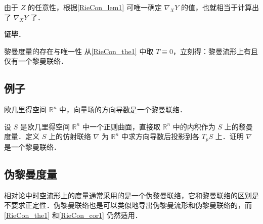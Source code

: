 由于 $Z$ 的任意性，根据\autoref{RieCon_lem1} 可唯一确定 $\nabla_XY$ 的值，也就相当于计算出了 $\nabla_XY$ 了．

\textbf{证毕}．

\begin{corollary}{黎曼度量的存在与唯一性}\label{RieCon_cor1}
从\autoref{RieCon_the1} 中取 $T\equiv 0$，立刻得：黎曼流形上有且仅有一个黎曼联络．
\end{corollary}

\subsection{例子}

\begin{example}{}
欧几里得空间 $\mathbb{R}^n$ 中，向量场的方向导数是一个黎曼联络．
\end{example}


\begin{exercise}{}
设 $S$ 是欧几里得空间 $\mathbb{R}^n$ 中一个正则曲面，直接取 $\mathbb{R}^n$ 中的内积作为 $S$ 上的黎曼度量．定义 $S$ 上的仿射联络 $\nabla$ 为 $\mathbb{R}^n$ 中求方向导数后投影到各 $T_pS$ 上．证明 $\nabla$ 是一个黎曼联络．
\end{exercise}

\subsection{伪黎曼度量}

相对论中时空流形上的度量通常采用的是一个伪黎曼联络，它和黎曼联络的区别是不要求正定性．伪黎曼联络也是可以类似地导出伪黎曼流形和伪黎曼联络的，而\autoref{RieCon_the1} 和\autoref{RieCon_cor1} 仍然适用．





